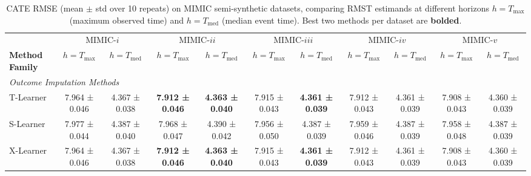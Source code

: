 \documentclass{article} %
\begin{document}
\begin{table}[!ht]
    \centering \small
    \caption{CATE RMSE (mean $\pm$ std over 10 repeats) on MIMIC semi-synthetic datasets, comparing RMST estimands at different horizons $h = T_{\max}$ (maximum observed time) and $h = T_{\text{med}}$ (median event time). Best two methods per dataset are \textbf{bolded}.}
    \label{tab:rmst-sensitivity-results}

    \setlength{\tabcolsep}{3pt}
    \renewcommand{\arraystretch}{0.92}

    \begin{adjustbox}{angle=90,max height=0.95\textheight,center}
    \begin{minipage}{\textheight}
        \begin{subtable}{\linewidth}
        \centering
        \begin{tabular}{l cc cc cc cc cc}
        \toprule
        & \multicolumn{2}{c}{MIMIC-$i$} 
        & \multicolumn{2}{c}{MIMIC-$ii$}
        & \multicolumn{2}{c}{MIMIC-$iii$}
        & \multicolumn{2}{c}{MIMIC-$iv$} 
        & \multicolumn{2}{c}{MIMIC-$v$} \\ 
        \cmidrule(lr){2-3}
        \cmidrule(lr){4-5}
        \cmidrule(lr){6-7}
        \cmidrule(lr){8-9}
        \cmidrule(lr){10-11}
        \textbf{Method Family} 
        & $h=T_{\max}$ & $h=T_{\text{med}}$
        & $h=T_{\max}$ & $h=T_{\text{med}}$
        & $h=T_{\max}$ & $h=T_{\text{med}}$
        & $h=T_{\max}$ & $h=T_{\text{med}}$
        & $h=T_{\max}$ & $h=T_{\text{med}}$ \\ \midrule
        \multicolumn{9}{l}{\textit{Outcome Imputation Methods}} \\
        T-Learner & 7.964 ± 0.046 & 4.367 ± 0.038 & \textbf{7.912 ± 0.046} & \textbf{4.363 ± 0.040} & 7.915 ± 0.043 & \textbf{4.361 ± 0.039} & 7.912 ± 0.043 & 4.361 ± 0.039 & 7.908 ± 0.043 & 4.360 ± 0.039 \\
        S-Learner & 7.977 ± 0.044 & 4.387 ± 0.040 & 7.968 ± 0.047 & 4.390 ± 0.042 & 7.956 ± 0.050 & 4.387 ± 0.039 & 7.959 ± 0.046 & 4.387 ± 0.039 & 7.958 ± 0.048 & 4.387 ± 0.039 \\ 
        X-Learner & 7.964 ± 0.046 & 4.367 ± 0.038 & \textbf{7.912 ± 0.046} & \textbf{4.363 ± 0.040} & 7.915 ± 0.043 & \textbf{4.361 ± 0.039} & 7.912 ± 0.043 & 4.361 ± 0.039 & 7.908 ± 0.043 & 4.360 ± 0.039 \\

\end{tabular}
\end{subtable}
\end{minipage}
\end{adjustbox}
\end{table}
\end{document}
